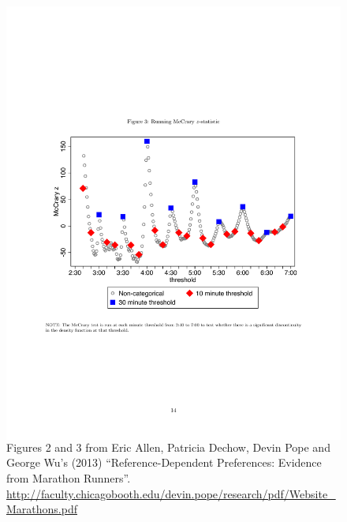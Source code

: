 \documentclass[notes=show]{beamer}
\begin{document}
\begin{frame}[shrink=20,plain]
\begin{center}
\begin{figure}
\begin{columns}
		\includegraphics[scale=0.4]{./lecture_includes/marathon_mccrary_tests.pdf}

		\end{columns}
		\caption{\scriptsize Figures 2 and 3 from Eric Allen, Patricia Dechow, Devin Pope and George Wu's (2013) ``Reference-Dependent Preferences: Evidence from Marathon Runners''. \url{http://faculty.chicagobooth.edu/devin.pope/research/pdf/Website_Marathons.pdf} }
		\end{figure}
        \end{center}
\end{frame}
\end{document}
